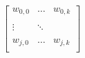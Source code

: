 \documentclass[10pt]{article}
\begin{document}
\begin{align*}\begin{bmatrix}
w_{0,0} & \dots & w_{0,k}\\
 & & \\
\vdots & \ddots & \\
& &  \\
w_{j,0} & \dots & w_{j,k}\\
\end{bmatrix}\end{align*}
\end{document}
